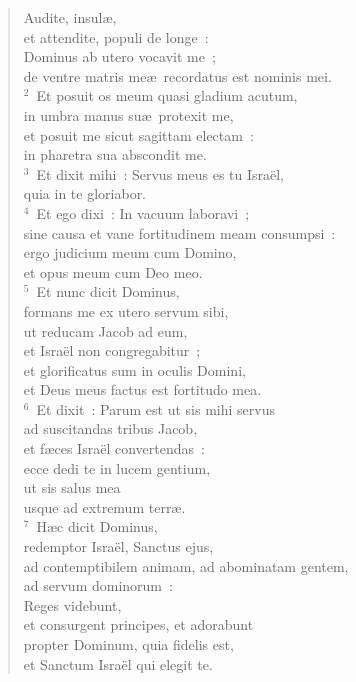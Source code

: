 \begin{flushleft}\begin{verse}\vspace{-19pt}\hspace{6pt}Audite, insul\ae ,\\\hspace{6pt} et attendite, populi de longe~:\\ Dominus ab utero vocavit me~;\\ de ventre matris me\ae\ recordatus est nominis mei.\\
${}^{2}$~Et posuit os meum quasi gladium acutum,\\ in umbra manus su\ae\ protexit me,\\ et posuit me sicut sagittam electam~:\\ in pharetra sua abscondit me.\\
${}^{3}$~Et dixit mihi~: Servus meus es tu Isra\"el,\\ quia in te gloriabor.\\
${}^{4}$~Et ego dixi~: In vacuum laboravi~;\\ sine causa et vane fortitudinem meam consumpsi~:\\ ergo judicium meum cum Domino,\\ et opus meum cum Deo meo.\\
${}^{5}$~Et nunc dicit Dominus,\\ formans me ex utero servum sibi,\\ ut reducam Jacob ad eum,\\ et Isra\"el non congregabitur~;\\ et glorificatus sum in oculis Domini,\\ et Deus meus factus est fortitudo mea.\\
${}^{6}$~Et dixit~: Parum est ut sis mihi servus\\ ad suscitandas tribus Jacob,\\ et f\ae ces Isra\"el convertendas~:\\ ecce dedi te in lucem gentium,\\ ut sis salus mea\\ usque ad extremum terr\ae .\\
${}^{7}$~H\ae c dicit Dominus,\\ redemptor Isra\"el, Sanctus ejus,\\ ad contemptibilem animam, ad abominatam gentem,\\ ad servum dominorum~:\\ Reges videbunt,\\ et consurgent principes, et adorabunt\\ propter Dominum, quia fidelis est,\\ et Sanctum Isra\"el qui elegit te.\end{verse}\end{flushleft}


